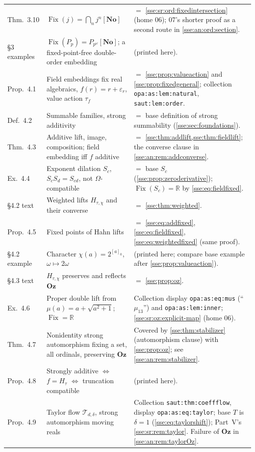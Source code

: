 \documentclass[11pt,a4paper]{article}
\numberwithin{equation}{section}
\theoremstyle{plain}
\theoremstyle{definition}
\theoremstyle{remark}
\newcommand{\No}{\mathbf{No}}
\newcommand{\Oz}{\mathbf{Oz}}
\newcommand{\R}{\mathbb{R}}
\newcommand{\Fix}{\operatorname{Fix}}
\newcommand{\lbl}[1]{\nolinkurl{#1}}%
\begin{document}
\begin{longtable}{P{17mm}P{60mm}P{73mm}}
Thm.~3.10 & $\Fix(j)=\bigcap_n j^n[\No]$ \cite[Prop.~5.2]{BVH} & $=$ \cref{sse:sr:ord:fixedintersection} (home 06); 07's shorter proof as a second route in \cref{sse:an:ord:section}. \\
\S3 examples & $\Fix(P_p)=P_{p^\omega}[\No]$; a fixed-point-free double-order embedding &  (printed here). \\
Prop.~4.1 & Field embeddings fix real algebraics, $f(r)=r+\varepsilon_r$, value action $\tau_f$ & $=$ \cref{sse:prop:valueaction} and \cref{sse:prop:fixedgeneral}; collection \lbl{opa:as:lem:natural}, \lbl{saut:lem:order}. \\
Def.~4.2 & Summable families, strong additivity & $=$ base definition of strong summability (\cref{sse:sec:foundations}). \\
Thm.~4.3 & Additive lift, image, composition; field embedding iff $f$ additive & $=$ \cref{sse:thm:addlift,sse:thm:fieldlift}; the converse clause in \cref{sse:an:rem:addconverse}. \\
Ex.~4.4 & Exponent dilation $S_c$, $S_cS_d=S_{cd}$, not $\Omega$-compatible & $=$ base $S_c$ (\cref{sse:prop:zeroderivative}); $\Fix(S_c)=\R$ by \eqref{sse:eq:fieldfixed}. \\
\S4.2 text & Weighted lifts $H_{\tau,\chi}$ and their converse & $=$ \cref{sse:thm:weighted}. \\
Prop.~4.5 & Fixed points of Hahn lifts & $=$ \eqref{sse:eq:addfixed}, \eqref{sse:eq:fieldfixed}, \eqref{sse:eq:weightedfixed} (same proof). \\
\S4.2 example & Character $\chi(a)=2^{[a]_0}$, $\omega\mapsto2\omega$ &  (printed here; compare base example after \cref{sse:prop:valueaction}). \\
\S4.3 text & $H_{\tau,\chi}$ preserves and reflects $\Oz$ & $=$ \cref{sse:prop:oz}. \\
Ex.~4.6 & Proper double lift from $\mu(a)=a+\sqrt{a^2+1}$; $\Fix=\R$ & Collection display \lbl{opa:as:eq:mus} (``$\mu_{13}$'') and \lbl{opa:as:lem:inner}; \eqref{sse:sr:oz:explicit-map} (home 06). \\
Thm.~4.7 & Nonidentity strong automorphism fixing a set, all ordinals, preserving $\Oz$ & Covered by \cref{sse:thm:stabilizer} (automorphism clause) with \cref{sse:prop:oz}; see \cref{sse:an:rem:stabilizer}. \\
Prop.~4.8 & Strongly additive $\iff$ $f=H_\tau$ $\iff$ truncation compatible &  (printed here). \\
Prop.~4.9 & Taylor flow $\mathcal T_{d,\delta}$, strong automorphism moving reals & Collection \lbl{saut:thm:coeffflow}, display \lbl{opa:as:eq:taylor}; base $T$ is $\delta=1$ (\eqref{sse:eq:taylorshift}); Part~V's \cref{sse:sr:rem:taylor}. Failure of $\Oz$ in \cref{sse:an:rem:taylorOz}. \\

\end{longtable}
\end{document}
